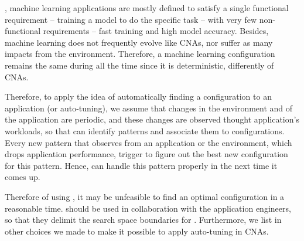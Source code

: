 , machine learning applications are mostly defined to satisfy a
single functional requirement -- training a model to do the specific task --
with very few non-functional requirements -- fast training and high model
accuracy.  Besides, machine learning does not frequently evolve like CNAs, nor
suffer as many impacts from the environment. Therefore, a machine learning
configuration remains the same during all the time since it is deterministic,
differently of CNAs.


 Therefore, to apply the idea of
automatically finding a configuration to an application (or auto-tuning), we
assume that changes in the environment and of the application are periodic, and
these changes are observed thought application's workloads, so that \name can
identify patterns and associate them to configurations. Every new pattern that
\name observes from an application or the environment, which drops application
performance, trigger \name to figure out the best new configuration for this
pattern. Hence, \name can handle this pattern properly in the next time it comes
up.

Therefore of using \name, it may be unfeasible to find an optimal configuration
in a reasonable time.  \name should be used in collaboration with the
application engineers, so that they delimit the search space boundaries for
\name. Furthermore, we list in  other choices we
made to make it possible to apply auto-tuning in CNAs.
